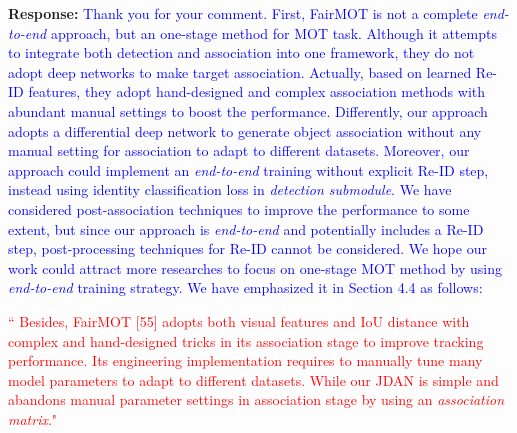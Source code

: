 \documentclass[12pt,journal,onecolumn]{IEEEtran}
\begin{document}
\textbf{Response:} \textcolor{blue}{Thank you for your comment.
First, FairMOT is not a complete \emph{end-to-end} approach, but an one-stage method for MOT task. 
Although it attempts to integrate both detection and association into one framework, they do not adopt deep networks to make target association.
Actually, based on learned Re-ID features, they adopt hand-designed and complex association methods with abundant manual settings to boost the performance.
Differently, our approach adopts a differential deep network to generate object association without any manual setting for association to adapt to different datasets. 
Moreover, our approach could implement an \emph{end-to-end} training without explicit Re-ID step, instead using identity classification loss in \emph{detection submodule}. 
We have considered post-association techniques to improve the performance to some extent, but since our approach is \emph{end-to-end} and potentially includes a Re-ID step, post-processing techniques for Re-ID cannot be considered.
We hope our work could attract more researches to focus on one-stage MOT method by using \emph{end-to-end} training strategy. 
We have emphasized it in Section 4.4 as follows:
}

\textcolor{red}{``
Besides, FairMOT [55] adopts both visual features and IoU distance with complex and hand-designed tricks in its association stage to improve tracking performance.
Its engineering implementation requires to manually tune many model parameters to adapt to different datasets.
While our JDAN is simple and abandons manual parameter settings in association stage by using an \emph{association matrix}."
} \\


%








\vspace{8pt} 


\vspace{8pt}


%
\end{document}
